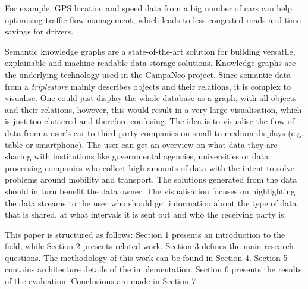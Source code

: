   For example, GPS location and speed data from a big number of cars can help optimising traffic flow management, which leads to less congested roads and time savings for drivers.

  Semantic knowledge graphs are a state-of-the-art solution for building versatile, explainable and machine-readable data storage solutions. Knowledge graphs are the underlying technology used in the CampaNeo project.
  Since semantic data from a \textit{triplestore} mainly describes objects and their relations, it is complex to visualise. One could just display the whole database as a graph, with all objects and their relations, however, this would result in a very large visualisation, which is just too cluttered and therefore confusing.
   The idea is to visualise the flow of data from a user's car to third party companies on small to medium displays (e.g. table or smartphone). The user can get an overview on what data they are sharing with institutions like governmental agencies, universities or data processing companies who collect high amounts of data with the intent to solve problems around mobility and transport. The solutions generated from the data should in turn benefit the data owner. The visualisation focuses on highlighting the data streams to the user who should get information about the type of data that is shared, at what intervals it is sent out and who the receiving party is.

   This paper is structured as follows: Section 1 presents an introduction to the field, while Section 2 presents related work. Section 3 defines the main research questions. The methodology of this work can be found in Section 4. Section 5 contains architecture details of the implementation. Section 6 presents the results of the evaluation. Conclusions are made in Section 7.

